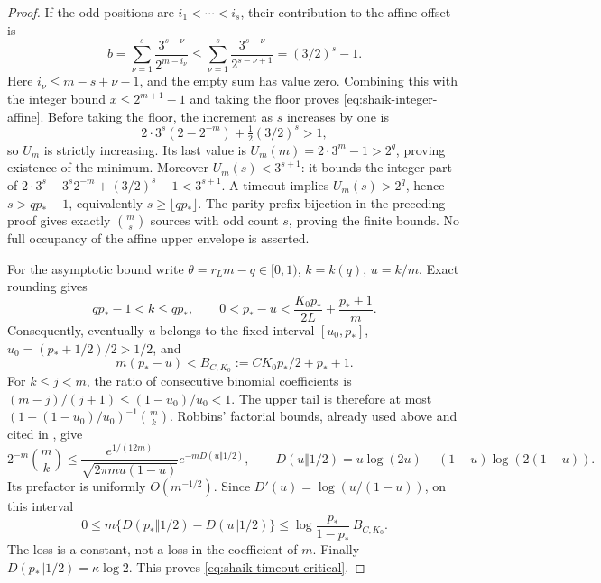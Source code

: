 \documentclass[11pt]{article}
\theoremstyle{remark}\newtheorem{remark}[proposition]{Remark}
\begin{document}
\begin{proof}
If the odd positions are \(i_1<\cdots<i_s\), their contribution to
the affine offset is
\[
 b=\sum_{\nu=1}^s\frac{3^{s-\nu}}{2^{m-i_\nu}}
 \le\sum_{\nu=1}^s\frac{3^{s-\nu}}{2^{s-\nu+1}}
 =(3/2)^s-1.
\]
Here \(i_\nu\le m-s+\nu-1\), and the empty sum has value zero.
Combining this with the integer bound \(x\le2^{m+1}-1\) and taking
the floor proves \eqref{eq:shaik-integer-affine}.
Before taking the floor, the increment as \(s\) increases by one is
\[
 2\cdot3^s(2-2^{-m})+\tfrac12(3/2)^s>1,
\]
so \(U_m\) is strictly increasing. Its last value is
\(U_m(m)=2\cdot3^m-1>2^q\), proving existence of the minimum.
Moreover \(U_m(s)<3^{s+1}\): it bounds the integer part of
\(2\cdot3^s-3^s2^{-m}+(3/2)^s-1<3^{s+1}\).
A timeout implies \(U_m(s)>2^q\), hence
\(s>qp_*-1\), equivalently \(s\ge\lfloor qp_*\rfloor\).
The parity-prefix bijection in the preceding proof gives exactly
\(\binom ms\) sources with odd count \(s\), proving the finite bounds.
No full occupancy of the affine upper envelope is asserted.

For the asymptotic bound write
\(\theta=r_Lm-q\in[0,1)\), \(k=k(q)\), \(u=k/m\).
Exact rounding gives
\[
 qp_*-1<k\le qp_*,\qquad
 0<p_*-u<
 \frac{K_0p_*}{2L}+\frac{p_*+1}{m}.
\]
Consequently, eventually \(u\) belongs to the fixed interval
\([u_0,p_*]\), \(u_0=(p_*+1/2)/2>1/2\), and
\[
 m(p_*-u)<B_{C,K_0}:=CK_0p_*/2+p_*+1.
\]
For \(k\le j<m\), the ratio of consecutive binomial coefficients
is \((m-j)/(j+1)\le(1-u_0)/u_0<1\).
The upper tail is therefore at most
\((1-(1-u_0)/u_0)^{-1}\binom mk\).
Robbins' factorial bounds, already used above and cited in
\cite{Robbins1955}, give
\[
 2^{-m}\binom mk\le
 \frac{e^{1/(12m)}}{\sqrt{2\pi m u(1-u)}}
 e^{-mD(u\Vert1/2)},\qquad
 D(u\Vert1/2)=u\log(2u)+(1-u)\log(2(1-u)).
\]
Its prefactor is uniformly \(O(m^{-1/2})\).
Since \(D'(u)=\log(u/(1-u))\), on this interval
\[
 0\le m\{D(p_*\Vert1/2)-D(u\Vert1/2)\}
 \le \log\frac{p_*}{1-p_*}\,B_{C,K_0}.
\]
The loss is a constant, not a loss in the coefficient of \(m\).
Finally \(D(p_*\Vert1/2)=\kappa\log2\). This proves
\eqref{eq:shaik-timeout-critical}.
\end{proof}
\end{document}
